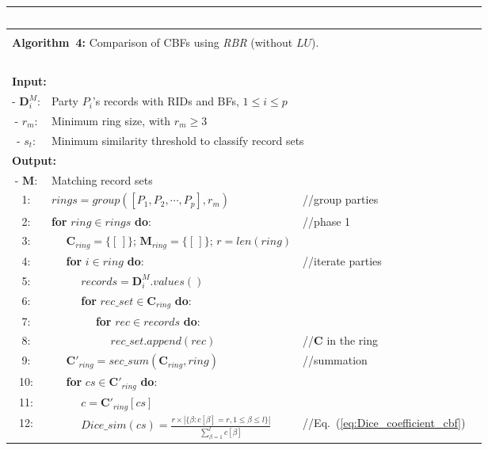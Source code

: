 \documentclass{sig-alternate}
\begin{document}
\begin{table}[!t]
\scriptsize\addtolength{\tabcolsep}{-6pt}
\begin{tabular*}{0.47\textwidth}{c @{\extracolsep{\fill}} lll}
  \label{algo_classify}
    ~ \\[2mm] \hline 
    \\[-2mm]
    \multicolumn{3}{l}{\textbf{Algorithm~4:} Comparison of CBFs using \emph{RBR} (without $LU$).}
      \\[0.5mm] \hline
    ~ \\[-3mm]
    \multicolumn{3}{l}{\textbf{Input:}} \\
    {- $\mathbf{D}^M_i$:} & \multicolumn{2}{l}{ Party $P_i$'s records with RIDs and BFs, $1 \le i \le p$} \\
    {- $r_m$:} & \multicolumn{2}{l}{ Minimum ring size, with $r_m \ge 3$} \\
    {- $s_t$:} & \multicolumn{2}{l}{ Minimum similarity threshold to classify record sets} \\
    \multicolumn{3}{l}{\textbf{Output:}} \\
    {- $\mathbf{M}$:} & \multicolumn{2}{l}{ Matching record sets} \\[1mm]
    1:  & $rings = group([P_1,P_2,\cdots, P_p],r_m)$&//group parties\\
    2:  & \textbf{for} $ring \in rings$ \textbf{do}:&//phase 1 \\
    3:  & ~~ $\mathbf{C}_{ring} = \{[\,]\}$; $\mathbf{M}_{ring} = \{[\,]\}$; $r = len(ring)$ & ~ \\
    4:  & ~~ \textbf{for} $i \in ring$ \textbf{do}:&//iterate parties\\    
    5:  & ~~ ~~ $records = \mathbf{D}^M_i.values()$ & ~ \\
    6:  & ~~ ~~ \textbf{for} $rec\_set \in \mathbf{C}_{ring}$ \textbf{do}: & ~ \\
    7:  & ~~ ~~ ~~ \textbf{for} $rec \in records$ \textbf{do}: & ~ \\
    8:  & ~~ ~~ ~~ ~~ $rec\_set.append(rec) $&//$\mathbf{C}$ in the ring\\
    9:  & ~~ $\mathbf{C'}_{ring} = sec\_sum(\mathbf{C}_{ring},ring)$&//summation\\
    10:  & ~~ \textbf{for} $cs \in \mathbf{C'}_{ring}$ \textbf{do}: & ~ \\
    11:  & ~~ ~~ $c = \mathbf{C'}_{ring}[cs]$ & ~ \\
    12:  & ~~ ~~ $Dice\_sim(cs) = \frac{r \times |\{\beta: c[\beta] = r, 1 \le \beta \le l\}|}{\sum_{\beta=1}^{l} c[\beta]}$&//Eq.~(\ref{eq:Dice_coefficient_cbf})\\ 

\end{tabular*}
\end{table}
\end{document}
